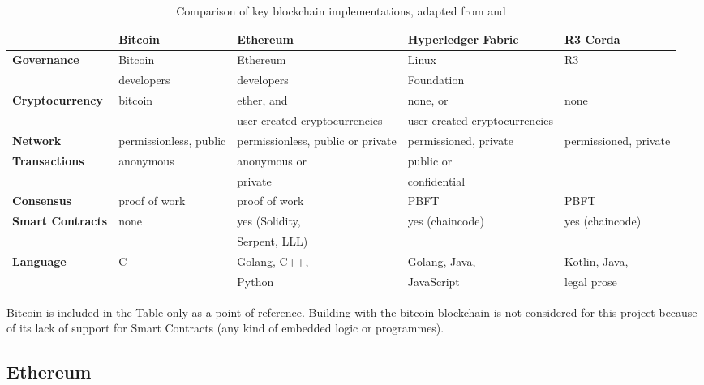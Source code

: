 \begin{table}[!ht] 
    \caption{Comparison of key blockchain implementations, adapted from \citet{ibm2018hyperledger} and \citet{valenta2017comparison}}
    \centering
    \label{table:blockchainscomparison}
    \begin{tabularx}{\textwidth}{>{\bfseries}lXXXX}
        \toprule
        & \textbf{Bitcoin} & \textbf{Ethereum} & \textbf{Hyperledger Fabric} & \textbf{R3 Corda}\\ 
        \midrule
        Governance & Bitcoin  & Ethereum & Linux & R3\\
        & developers & developers & Foundation\\
        \midrule       
        Cryptocurrency & bitcoin & ether, and & none, or & none \\ 
        & & user-created cryptocurrencies & user-created cryptocurrencies & \\         
        \midrule
        Network & permissionless, public & permissionless, public or private & permissioned, private & permissioned, private\\ 
        \midrule        
        Transactions & anonymous & anonymous or & public or & \\ 
        & & private & confidential & \\         
        \midrule        
        Consensus & proof of work & proof of work & PBFT & PBFT\\
        \midrule               
        Smart Contracts & none & yes (Solidity, & yes (chaincode) & yes (chaincode)\\ 
        & & Serpent, LLL) \\         
        \hline
        Language & C++ & Golang, C++, & Golang, Java, & Kotlin, Java, \\ 
        & & Python & JavaScript & legal prose\\         
        \bottomrule
    \end{tabularx}
\end{table}

Bitcoin is included in the Table only as a point of reference. Building with the bitcoin 
blockchain is not considered for this project because of its lack of support for Smart 
Contracts (any kind of embedded logic or programmes).

\subsection*{Ethereum}


